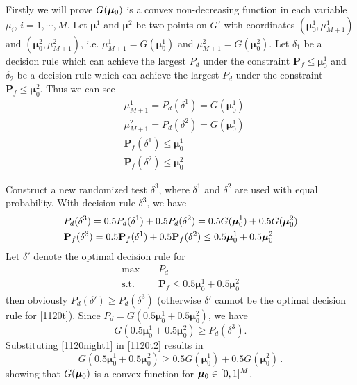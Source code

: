 Firstly we will prove $G(\boldsymbol{\mu}_0)$ is a convex non-decreasing function in each variable $\mu_i$, $i = 1, \cdots, M$.
 Let $\boldsymbol{\mu}^1$ and  $\boldsymbol{\mu}^2$ be two points on $G'$ with coordinates $(\boldsymbol{\mu}^1_0, \mu_{M+1}^1)$ and $(\boldsymbol{\mu}^2_0, \mu_{M+1}^2)$, i.e. $\mu_{M+1}^1 = G(\boldsymbol{\mu}_0^1)$ and $\mu_{M+1}^2 = G(\boldsymbol{\mu}_0^2)$. Let $\delta_1$ be a decision rule which can achieve the largest $P_d$ under the constraint $\mathbf{P}_f \leq \boldsymbol{\mu}_0^1$ and $\delta_2$ be a decision rule which can achieve the largest $P_d$ under the constraint $\mathbf{P}_{f} \leq \boldsymbol{\mu}_0^2$. Thus we can see 
 \begin{subequations}
\begin{align}
&\mu_{M+1}^1 = P_d(\delta^1) = G(\boldsymbol{\mu}_0^1)\\
&\mu_{M+1}^2 = P_d(\delta^2)=G(\boldsymbol{\mu}_0^1)\\
&\mathbf{P}_f(\delta^1) \leq \boldsymbol{\mu}^1_0\\
&\mathbf{P}_f(\delta^2) \leq \boldsymbol{\mu}^2_0
\end{align}
 \end{subequations}
 
Construct a new randomized test $\delta^3$, where $\delta^1$ and $\delta^2$ are used with equal probability. With decision rule $\delta^3$, we have 
\begin{subequations}
\begin{align}
\label{1120night1}
&P_d(\delta^3) = 0.5P_d(\delta^1)+0.5P_d(\delta^2) = 0.5G(\boldsymbol{\mu}_0^1) + 0.5G(\boldsymbol{\mu}_0^2)\\
&\mathbf{P}_{f}(\delta^3) = 0.5\mathbf{P}_f(\delta^1)+0.5\mathbf{P}_f(\delta^2) \leq 0.5\boldsymbol{\mu}^1_0 + 0.5\boldsymbol{\mu}^2_0
\end{align}
\end{subequations}
Let $\delta'$ denote the optimal decision rule for 
 \begin{equation}
 \begin{split}
 \label{1120t}
 \max&\;\;\;\;P_d\\
 \text{s.t.}&\;\;\;\;\mathbf{P}_f \leq 0.5\boldsymbol{\mu}^1_0 + 0.5\boldsymbol{\mu}^2_0
 \end{split}
 \end{equation}
then obviously $P_d(\delta') \geq P_d(\delta^3)$ (otherwise $\delta'$ cannot be the optimal decision rule for \eqref{1120t}). Since $P_d = G(0.5\boldsymbol{\mu}^1_0 + 0.5\boldsymbol{\mu}^2_0)$, we have  
\begin{equation}
\label{1120t2}
G(0.5\boldsymbol{\mu}^1_0 + 0.5\boldsymbol{\mu}^2_0) \geq  P_d(\delta^3).
\end{equation}
Substituting \eqref{1120night1} in \eqref{1120t2} results in
\begin{equation}
\label{1120t3}
G(0.5\boldsymbol{\mu}^1_0 + 0.5\boldsymbol{\mu}^2_0) \geq 0.5 G(\boldsymbol{\mu}^1_0)+ 0.5 G(\boldsymbol{\mu}^2_0)\,.
\end{equation}
showing that  $G(\boldsymbol{\mu}_0)$ is a convex function for $\boldsymbol{\mu}_0 \in [0, 1]^M$.

